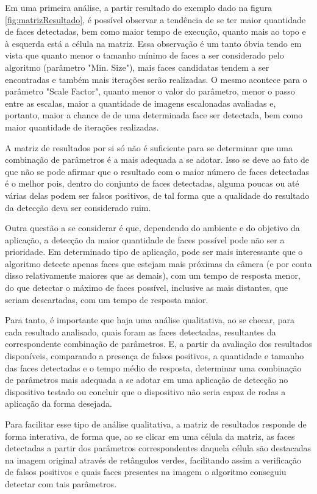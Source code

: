 Em uma primeira análise, a partir resultado do exemplo dado na figura \ref{fig:matrizResultado}, é possível observar a tendência de se ter maior quantidade de faces detectadas, bem como maior tempo de execução, quanto mais ao topo e à esquerda está a célula na matriz. Essa observação é um tanto óbvia tendo em vista que quanto menor o tamanho mínimo de faces a ser considerado pelo algoritmo (parâmetro "Min. Size"), mais faces candidatas tendem a ser encontradas e também mais iterações serão realizadas. O mesmo acontece para o parâmetro "Scale Factor", quanto menor o valor do parâmetro, menor o passo entre as escalas, maior a quantidade de imagens escalonadas avaliadas e, portanto, maior a chance de de uma determinada face ser detectada, bem como maior quantidade de iterações realizadas.

A matriz de resultados por si só não é suficiente para se determinar que uma combinação de parâmetros é a mais adequada a se adotar. Isso se deve ao fato de que não se pode afirmar que o resultado com o maior número de faces detectadas é o melhor pois, dentro do conjunto de faces detectadas, alguma poucas ou até várias delas podem ser falsos positivos, de tal forma que a qualidade do resultado da detecção deva ser considerado ruim. 

Outra questão a se considerar é que, dependendo do ambiente e do objetivo da aplicação, a detecção da maior quantidade de faces possível pode não ser a prioridade. Em determinado tipo de aplicação, pode ser mais interessante que o algoritmo detecte apenas faces que estejam mais próximas da câmera (e por conta disso relativamente maiores que as demais), com um tempo de resposta menor, do que detectar o máximo de faces possível, inclusive as mais distantes, que seriam descartadas, com um tempo de resposta maior.

Para tanto, é importante que haja uma análise qualitativa, ao se checar, para cada resultado analisado, quais foram as faces detectadas, resultantes da correspondente combinação de parâmetros. E, a partir da avaliação dos resultados disponíveis, comparando a presença de falsos positivos, a quantidade e tamanho das faces detectadas e o tempo médio de resposta, determinar uma combinação de parâmetros mais adequada a se adotar em uma aplicação de detecção no dispositivo testado ou concluir que o dispositivo não seria capaz de rodas a aplicação da forma desejada.

Para facilitar esse tipo de análise qualitativa, a matriz de resultados responde de forma interativa, de forma que, ao se clicar em uma célula da matriz, as faces detectadas a partir dos parâmetros correspondentes daquela célula são destacadas na imagem original através de retângulos verdes, facilitando assim a verificação de falsos positivos e quais faces presentes na imagem o algoritmo conseguiu detectar com tais parâmetros.


